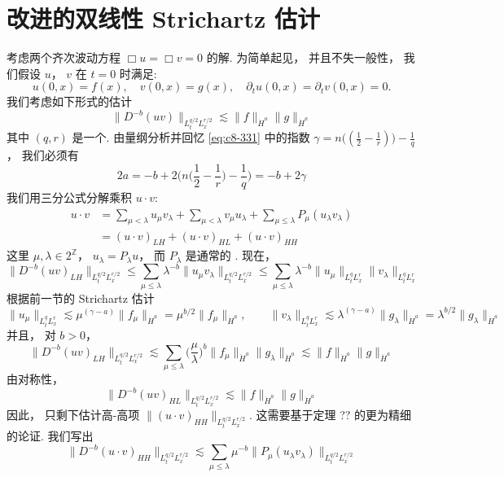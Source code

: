 \section{改进的双线性 Strichartz 估计}

考虑两个齐次波动方程 $\Box u = \Box v = 0$ 的解. 为简单起见， 并且不失一般性， 我们假设 $u$， $v$ 在 $t = 0$ 时满足:
\[
u(0, x) = f(x), \quad v(0, x) = g(x), \quad \partial_t u(0, x) = \partial_t v(0, x) = 0.
\]
我们考虑如下形式的估计
\[
\|D^{-b}(uv)\|_{L_t^{q/2}L_x^{r/2}} \lesssim \|f\|_{\dot H^a}\|g\|_{\dot H^a}
\]
其中 $(q, r)$ 是一个. 由量纲分析并回忆 \eqref{eq:c8-331} 中的指数 $\gamma = n\big((\frac{1}{2} - \frac{1}{r})\big) - \frac{1}{q}$， 我们必须有
\begin{equation}
2a = -b + 2\bigl(n\big(\frac{1}{2} - \frac{1}{r}\big) - \frac{1}{q}\bigr) = -b + 2\gamma\label{eq:c9-389}
\end{equation}
我们用三分公式分解乘积 $u\cdot v$:
\[
\begin{aligned}
u\cdot v &= \sum_{\mu<\lambda}u_\mu v_\lambda + \sum_{\mu<\lambda}v_\mu u_\lambda + \sum_{\mu\leq\lambda}P_\mu(u_\lambda v_\lambda)\\
&= (u\cdot v)_{LH} + (u\cdot v)_{HL} + (u\cdot v)_{HH}
\end{aligned}
\]
这里 $\mu, \lambda\in 2^{\mathbb{Z}}$， $u_\lambda = P_\lambda u$， 而 $P_\lambda$ 是通常的 . 现在，
\[
\|D^{-b}(uv)_{LH}\|_{L_t^{q/2}L_x^{r/2}} \leq \sum_{\mu\leq\lambda}\lambda^{-b}\|u_\mu v_\lambda\|_{L_t^{q/2}L_x^{r/2}} \leq \sum_{\mu\leq\lambda}\lambda^{-b}\|u_\mu\|_{L_t^q L_x^r}\|v_\lambda\|_{L_t^q L_x^r}
\]
根据前一节的 Strichartz 估计
\[
\|u_\mu\|_{L_t^q L_x^r} \lesssim \mu^{(\gamma-a)}\|f_\mu\|_{\dot H^a} = \mu^{b/2}\|f_\mu\|_{\dot H^a}, \qquad
\|v_\lambda\|_{L_t^q L_x^r} \lesssim \lambda^{(\gamma-a)}\|g_\lambda\|_{\dot H^a} = \lambda^{b/2}\|g_\lambda\|_{\dot H^a}
\]
并且， 对 $b > 0$，
\[
\|D^{-b}(uv)_{LH}\|_{L_t^{q/2}L_x^{r/2}} \lesssim \sum_{\mu\leq\lambda}\big(\frac{\mu}{\lambda}\big)^b\|f_\mu\|_{\dot H^a}\|g_\lambda\|_{\dot H^a} \lesssim \|f\|_{\dot H^a}\|g\|_{\dot H^a}
\]
由对称性，
\[
\|D^{-b}(uv)_{HL}\|_{L_t^{q/2}L_x^{r/2}} \lesssim \|f\|_{\dot H^a}\|g\|_{\dot H^a}
\]
因此， 只剩下估计高-高项 $\|(u\cdot v)_{HH}\|_{L_t^{q/2}L_x^{r/2}}$. 这需要基于定理 ?? 的更为精细的论证. 我们写出
\[
\|D^{-b}(u\cdot v)_{HH}\|_{L_t^{q/2}L_x^{r/2}} \lesssim \sum_{\mu\leq\lambda}\mu^{-b}\|P_\mu(u_\lambda v_\lambda)\|_{L_t^{q/2}L_x^{r/2}}
\]
